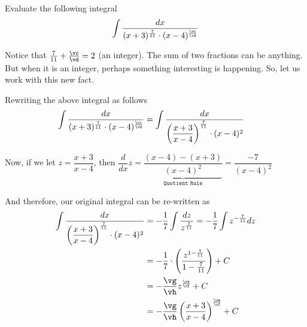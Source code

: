 



\va\vb\vc\vd
{}\va\vb\ve\vf
{}\ve\vf\vg\vh

\question[5] Evaluate the following integral 
    \[ \int\dfrac{dx}{(x+3)^{\frac\va\vb}\cdot (x-4)^{\frac\vc\vd}}\]


\watchout

\begin{solution}[\fullpage]
  Notice that $\frac\va\vb + \frac\vc\vd = 2$ (an integer). The sum of two fractions can be anything. 
  But when it is an integer, perhaps something interesting is happening. So, let us work with this new fact. 

  Rewriting the above integral as follows
  \begin{align}
    \int\dfrac{dx}{(x+3)^{\frac\va\vb}\cdot (x-4)^{\frac\vc\vd}} &= 
    \int\dfrac{dx}{\left( \dfrac{x+3}{x-4} \right)^{\frac\va\vb}\cdot (x-4)^2}
  \end{align}

  Now, if we let $z=\dfrac{x+3}{x-4}$, then 
  $\dfrac{d}{dx} z = \underbrace{\dfrac{(x-4)-(x+3)}{(x-4)^2}}_{\texttt{Quotient Rule}} = \dfrac{-7}{(x-4)^2}$

  And therefore, our original integral can be re-written as 
  \begin{align}
    \int\dfrac{dx}{\left( \dfrac{x+3}{x-4} \right)^{\frac\va\vb}\cdot (x-4)^2} &= 
    -\dfrac{1}{7}\int\dfrac{dz}{z^{\frac\va\vb}} = -\dfrac{1}{7}\int z^{-\frac\va\vb} dz \\
    &= -\dfrac{1}{7}\cdot\left( \dfrac{z^{1-\frac\va\vb}}{1-\frac\va\vb}\right) + C \\
    &= -\dfrac\vg\vh z^\frac\ve\vf + C  \\
    &= -\dfrac\vg\vh\left( \dfrac{x+3}{x-4} \right)^\frac\ve\vf + C 
  \end{align}
\end{solution}

